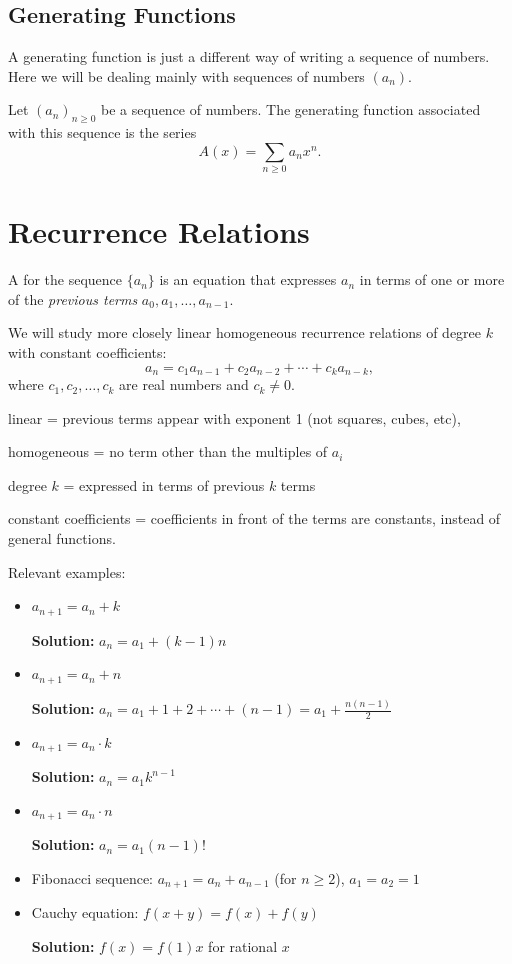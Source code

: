 \section{Generating Functions}
A generating function is just a different way of writing a sequence of numbers. Here we will be dealing mainly with sequences of numbers $(a_n)$.
\begin{defn}{}{}
Let $(a_n)_{n\ge0}$ be a sequence of numbers. The generating function associated with this sequence is the series
\[ A(x)=\sum_{n\ge0}a_nx^n. \]
\end{defn}

\chapter{Recurrence Relations}

A  for the sequence $\{a_n\}$ is an equation that expresses $a_n$ in terms of one or more of the \emph{previous terms} $a_0,a_1,\dots,a_{n-1}$.

We will study more closely linear homogeneous recurrence relations of degree $k$ with constant coefficients:
\[ a_n = c_1a_{n-1} + c_2a_{n-2} + \cdots + c_ka_{n-k}, \]
where $c_1,c_2,\dots,c_k$ are real numbers and $c_k \neq 0$.

\begin{remark}
linear = previous terms appear with exponent 1 (not squares, cubes, etc),

homogeneous = no term other than the multiples of $a_i$

degree $k$ = expressed in terms of previous $k$ terms

constant coefficients = coefficients in front of the terms are constants, instead of general functions.
\end{remark}

Relevant examples:
\begin{itemize}
\item $a_{n+1} = a_n + k$

\textbf{Solution:} $a_n = a_1 + (k-1)n$

\item $a_{n+1} = a_n + n$

\textbf{Solution:} $a_n=a_1+1+2+\cdots+(n-1)=a_1+\frac{n(n-1)}{2}$

\item $a_{n+1} = a_n \cdot k$

\textbf{Solution:} $a_n = a_1k^{n-1}$

\item $a_{n+1} = a_n \cdot n$

\textbf{Solution:} $a_n = a_1(n-1)!$

\item Fibonacci sequence: $a_{n+1} = a_n + a_{n-1}$ (for $n \ge 2$), $a_1=a_2=1$

\item Cauchy equation: $f(x+y)=f(x)+f(y)$

\textbf{Solution:} $f(x)=f(1)x$ for rational $x$

\end{itemize}

